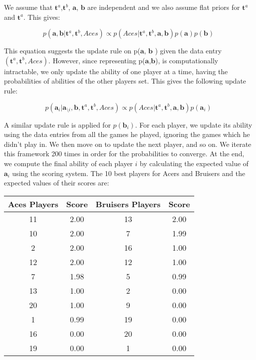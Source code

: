 \documentclass[11pt,a4paper,oneside]{report}
\begin{document}
We assume that $\textbf{t}^a$,$\textbf{t}^b$, $\textbf{a}$, $\textbf{b}$ are independent and we also assume flat priors for $\textbf{t}^a$ and $\textbf{t}^a$. This gives:

\begin{equation}
 p(\textbf{a},\textbf{b}|\textbf{t}^a, \textbf{t}^b,Aces)\propto p(Aces| \textbf{t}^a, \textbf{t}^b, \textbf{a}, \textbf{b}) p(\textbf{a}) p(\textbf{b})
\end{equation}

This equation suggests the update rule on p($\textbf{a}$, $\textbf{b}$ ) given the data entry $(\textbf{t}^a, \textbf{t}^b,Aces)$. However, since representing p($\textbf{a}$,$\textbf{b}$), is computationally intractable, we only update the ability of one player at a time, having the probabilities of abilities of the other players set. This gives the following update rule:

\begin{equation}
  p(\textbf{a}_i | \textbf{a}_{\setminus i}, \textbf{b}, \textbf{t}^a, \textbf{t}^b,Aces) \propto p(Aces| \textbf{t}^a, \textbf{t}^b, \textbf{a}, \textbf{b}) p(\textbf{a}_i)
\end{equation}

A similar update rule is applied for $p(\textbf{b}_i)$. For each player, we update its ability using the data entries from all the games he played, ignoring the games which he didn't play in. We then move on to update the next player, and so on. We iterate this framework 200 times in order for the probabilities to converge. At the end, we compute the final ability of each player $i$ by calculating the expected value of $\textbf{a}_i$ using the scoring system. The 10 best players for Acers and Bruisers and the expected values of their scores are:


\begin{tabular}{ c | c || c | c }
  Aces Players & Score  & Bruisers Players & Score \\
  \hline  
   11 &    2.00 &  13 &    2.00\\
   10 &   2.00 &   7 &  1.99\\
    2 &   2.00 &  16 &  1.00\\
   12 &   2.00 &  12 &  1.00\\
    7 &   1.98 &   5 &  0.99\\
   13 &   1.00 &   2 &  0.00\\
   20 &   1.00 &   9 &  0.00\\
    1 &   0.99 &  19 &   0.00\\
   16 &   0.00 &  20 &  0.00\\
   19 &   0.00 &   1 &  0.00\\
\end{tabular}\\\\
\end{document}
